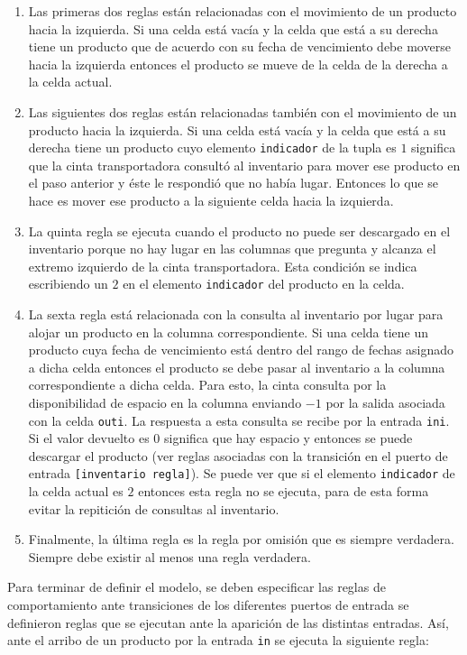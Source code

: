 \documentclass[10pt]{article}
\begin{document}
\begin{enumerate}
	\item Las primeras dos reglas están relacionadas con el movimiento de un producto hacia la izquierda. Si una celda está vacía y la celda que está a su derecha tiene un producto que de acuerdo con su fecha de vencimiento debe moverse hacia la izquierda entonces el producto se mueve de la celda de la derecha a la celda actual.
	\item Las siguientes dos reglas están relacionadas también con el movimiento de un producto hacia la izquierda. Si una celda está vacía y la celda que está a su derecha tiene un producto cuyo elemento \texttt{indicador} de la tupla es $1$ significa que la cinta transportadora consultó al inventario para mover ese producto en el paso anterior y éste le respondió que no había lugar. Entonces lo que se hace es mover ese producto a la siguiente celda hacia la izquierda.
	\item La quinta regla se ejecuta cuando el producto no puede ser descargado en el inventario porque no hay lugar en las columnas que pregunta y alcanza el extremo izquierdo de la cinta transportadora. Esta condición se indica escribiendo un $2$ en el elemento \texttt{indicador} del producto en la celda.
	\item La sexta regla está relacionada con la consulta al inventario por lugar para alojar un producto en la columna correspondiente. Si una celda tiene un producto cuya fecha de vencimiento está dentro del rango de fechas asignado a dicha celda entonces el producto se debe pasar al inventario a la columna correspondiente a dicha celda. Para esto, la cinta consulta por la disponibilidad de espacio en la columna enviando $-1$ por la salida asociada con la celda \texttt{outi}. La respuesta a esta consulta se recibe por la entrada \texttt{ini}. Si el valor devuelto es $0$ significa que hay espacio y entonces se puede descargar el producto (ver reglas asociadas con la transición en el puerto de entrada \texttt{[inventario regla]}).  Se puede ver que si el elemento \texttt{indicador} de la celda actual es $2$ entonces esta regla no se ejecuta, para de esta forma evitar la repitición de consultas al inventario.
	\item Finalmente, la última regla es la regla por omisión que es siempre verdadera. Siempre debe existir al menos una regla verdadera.
\end{enumerate}

Para terminar de definir el modelo, se deben especificar las reglas de comportamiento ante transiciones de los diferentes puertos de entrada se definieron reglas que se ejecutan ante la aparición de las distintas entradas. Así, ante el arribo de un producto por la entrada \texttt{in} se ejecuta la siguiente regla:
\end{document}
